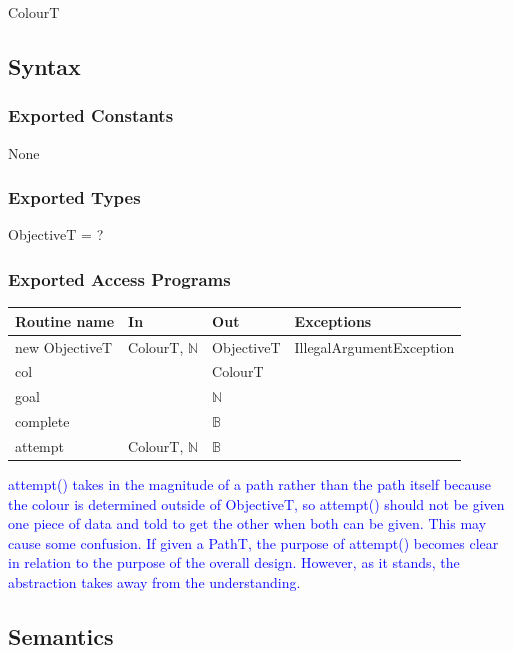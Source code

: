 \documentclass[12pt]{article}
\newcommand{\note}{\noindent \textcolor{blue}}
\begin{document}
ColourT

\subsection* {Syntax}

\subsubsection* {Exported Constants}

None

\subsubsection* {Exported Types}

ObjectiveT = ?

\subsubsection* {Exported Access Programs}

\begin{tabular}{| l | l | l | l |}
	\hline
	\textbf{Routine name} & \textbf{In} & \textbf{Out} & \textbf{Exceptions}\\
	\hline
	new ObjectiveT & ColourT, $\mathbb{N}$ & ObjectiveT & IllegalArgumentException\\
	\hline
	col & ~ & ColourT & ~\\
	\hline
	goal & ~ & $\mathbb{N}$ & ~\\
	\hline
	complete & ~ & $\mathbb{B}$ & ~\\
	\hline
	attempt & ColourT, $\mathbb{N}$ & $\mathbb{B}$ & ~\\
	\hline
\end{tabular}

\note{attempt() takes in the magnitude of a path rather than the path itself because the colour is determined outside of ObjectiveT, so attempt() should not be given one piece of data and told to get the other when both can be given. This may cause some confusion. If given a PathT, the purpose of attempt() becomes clear in relation to the purpose of the overall design. However, as it stands, the abstraction takes away from the understanding. }\\

\subsection* {Semantics}
\end{document}

